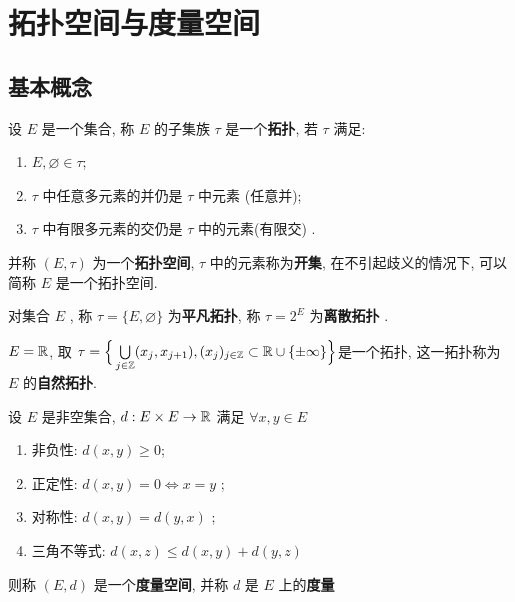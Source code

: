 \chapter{拓扑空间与度量空间}
\section{基本概念}

     \begin{Definition}[拓扑空间]\label{def:拓扑空间}
          设 $ E $ 是一个集合, 称 $ E $ 的子集族 $ \tau $ 是一个\textbf{拓扑}, 若 $ \tau $ 满足: 
          \begin{enumerate}[($ \mathrm{O}_1 $), itemindent=2.5\parindent]
                \item $ E, \varnothing\in \tau $;
               \item\label{item:O2} $ \tau $ 中任意多元素的并仍是 $ \tau $ 中元素 (任意并);
               \item\label{item:O3} $ \tau $ 中有限多元素的交仍是 $ \tau $ 中的元素(有限交) . 
          \end{enumerate}
          并称 $ (E, \tau) $ 为一个\textbf{拓扑空间}, $ \tau $ 中的元素称为\textbf{开集}, 在不引起歧义的情况下, 可以简称 $ E $ 是一个拓扑空间. 
     \end{Definition}

     \begin{Remark}\label{rmk:平凡离散}
          对集合 $ E $ , 称 $ \tau=\{ E, \varnothing \} $ 为\textbf{平凡拓扑}, 称 $ \tau=2^{E} $ 为\textbf{离散拓扑} . 
     \end{Remark}

     \begin{Example}
          $ E=\mathbb{R} $, 取 $ \tau=\Big\{ \bigcup\limits_{j\in\mathbb{Z}}(x_{j}, x_{j+1}), (x_{j})_{j\in\mathbb{Z}}\subset \mathbb{R}\cup\{ \pm\infty \} \Big\} $是一个拓扑, 这一拓扑称为 $ E $ 的\textbf{自然拓扑}. 
     \end{Example}

     \begin{Definition}[度量空间]\label{def:度量空间}
          设 $ E $ 是非空集合, $ d: E\times E\to \mathbb{R} $ 满足 $ \forall x, y\in E $
          \begin{enumerate}[(1)]
               \item 非负性: $ d(x, y)\geqslant 0 $;
               \item 正定性: $ d(x, y)=0\Longleftrightarrow x=y $ ;
               \item 对称性: $ d(x, y)=d(y, x) $ ;
               \item 三角不等式: $ d(x, z)\leqslant d(x, y)+d(y, z) $ 
          \end{enumerate}
          则称 $ (E, d) $ 是一个\textbf{度量空间}, 并称 $ d $ 是 $ E $ 上的\textbf{度量}
     \end{Definition}

